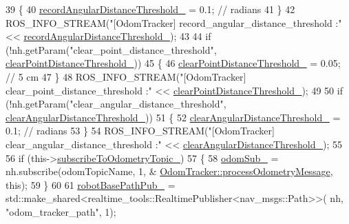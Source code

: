 \begin{DoxyCode}
39   \{
40     \hyperlink{classcl__move__base__z_1_1odom__tracker_1_1OdomTracker_a1274fe5334c109cd9c2339beb9411441}{recordAngularDistanceThreshold\_} = 0.1;  \textcolor{comment}{// radians}
41   \}
42   ROS\_INFO\_STREAM(\textcolor{stringliteral}{"[OdomTracker] record\_angular\_distance\_threshold :"} << 
      \hyperlink{classcl__move__base__z_1_1odom__tracker_1_1OdomTracker_a1274fe5334c109cd9c2339beb9411441}{recordAngularDistanceThreshold\_});
43 
44   \textcolor{keywordflow}{if} (!nh.getParam(\textcolor{stringliteral}{"clear\_point\_distance\_threshold"}, 
      \hyperlink{classcl__move__base__z_1_1odom__tracker_1_1OdomTracker_a7155d25d0e8dd9f237a79ff503b80e26}{clearPointDistanceThreshold\_}))
45   \{
46     \hyperlink{classcl__move__base__z_1_1odom__tracker_1_1OdomTracker_a7155d25d0e8dd9f237a79ff503b80e26}{clearPointDistanceThreshold\_} = 0.05;  \textcolor{comment}{// 5 cm}
47   \}
48   ROS\_INFO\_STREAM(\textcolor{stringliteral}{"[OdomTracker] clear\_point\_distance\_threshold :"} << 
      \hyperlink{classcl__move__base__z_1_1odom__tracker_1_1OdomTracker_a7155d25d0e8dd9f237a79ff503b80e26}{clearPointDistanceThreshold\_});
49 
50   \textcolor{keywordflow}{if} (!nh.getParam(\textcolor{stringliteral}{"clear\_angular\_distance\_threshold"}, 
      \hyperlink{classcl__move__base__z_1_1odom__tracker_1_1OdomTracker_a1b79dd86745adfb31db822e0c8106282}{clearAngularDistanceThreshold\_}))
51   \{
52     \hyperlink{classcl__move__base__z_1_1odom__tracker_1_1OdomTracker_a1b79dd86745adfb31db822e0c8106282}{clearAngularDistanceThreshold\_} = 0.1;  \textcolor{comment}{// radians}
53   \}
54   ROS\_INFO\_STREAM(\textcolor{stringliteral}{"[OdomTracker] clear\_angular\_distance\_threshold :"} << 
      \hyperlink{classcl__move__base__z_1_1odom__tracker_1_1OdomTracker_a1b79dd86745adfb31db822e0c8106282}{clearAngularDistanceThreshold\_});
55 
56   \textcolor{keywordflow}{if} (this->\hyperlink{classcl__move__base__z_1_1odom__tracker_1_1OdomTracker_afbe614b53a1493eb8268b8ea65b5b93a}{subscribeToOdometryTopic\_})
57   \{
58     \hyperlink{classcl__move__base__z_1_1odom__tracker_1_1OdomTracker_ab55df0e91246e43dff80912dc35a4fee}{odomSub\_} = nh.subscribe(odomTopicName, 1, &
      \hyperlink{classcl__move__base__z_1_1odom__tracker_1_1OdomTracker_a12c5a839cfde2e8f2f55a5e0c9647b18}{OdomTracker::processOdometryMessage}, \textcolor{keyword}{this});
59   \}
60 
61   \hyperlink{classcl__move__base__z_1_1odom__tracker_1_1OdomTracker_a40a7cbb6bb6595e250e7c685c781613b}{robotBasePathPub\_} = std::make\_shared<realtime\_tools::RealtimePublisher<nav\_msgs::Path>>(
      nh, \textcolor{stringliteral}{"odom\_tracker\_path"}, 1);

\end{DoxyCode}
